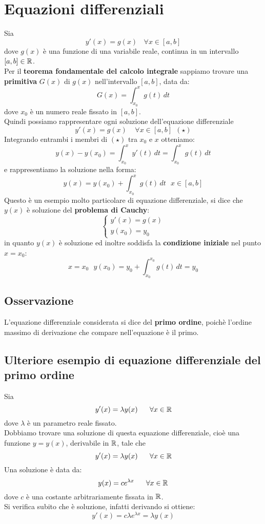 \documentclass[../../main.tex]{subfiles}
\begin{document}
\section{Equazioni differenziali}
Sia
\[
    y'(x) = g(x) \ \ \ \ \forall x \in [a, b]
\]
dove $g(x)$ è una funzione di una variabile reale, continua in un intervallo
$[a, b] \in \mathbb{R}$.\\ Per il \textbf{teorema fondamentale del calcolo integrale}
sappiamo trovare una \textbf{primitiva} $G(x)$ di $g(x)$ nell'intervallo
$[a,b]$, data da:
\[
    G(x) = {\int_{x_0}^{x}  g(t)\,dt }
\]
dove $x_0$ è un numero reale fissato in $[a, b]$. \\ Quindi possiamo
rappresentare ogni soluzione dell'equazione differenziale
\[
    y'(x) = g(x) \ \ \ \ \ \forall x\in [a, b] \ \ (\star)
\]
Integrando entrambi i membri di $(\star)$ tra $x_0$ e $x$ otteniamo:
\[
    y(x)-y(x_0) = \int_{x_0}^{x} y'(t)\,dt = \int_{x_0}^{x} g(t)\,dt
\]
e rappresentiamo la soluzione nella forma:
\[
    y(x) = y(x_0) + \int_{x_0}^{x} g(t)\,dt \ \ \ x\in [a, b]
\]
Questo è un esempio molto particolare di equazione differenziale, si dice che
$y(x)$ è soluzione del \textbf{problema di Cauchy}:
\[
    \begin{cases}
        y'(x) = g(x) \\
        y(x_0) = y_0
    \end{cases}
\]
in quanto $y(x)$ è soluzione ed inoltre soddisfa la \textbf{condizione
    iniziale} nel punto $x = x_0$:
\[
    x = x_0 \ \ \ y(x_0) = y_0 + \int_{x_0}^{x_0} g(t)\,dt = y_0
\]
\subsection{Osservazione}
L'equazione differenziale considerata si dice del \textbf{primo ordine}, poichè
l'ordine massimo di derivazione che compare nell'equazione è il primo.

\subsection{Ulteriore esempio di equazione differenziale del primo ordine}
Sia
\[
    y'(x) = \lambda y(x) \ \ \ \ \ \forall x \in \R
\]
dove $\lambda$ è un parametro reale fissato. \\ Dobbiamo trovare una soluzione
di questa equazione differenziale, cioè una funzione $y = y(x)$, derivabile in
$\mathbb{R}$, tale che
\[
    y'(x) = \lambda y(x) \ \ \ \ \ \forall x \in \R
\]
Una soluzione è data da:
\[
    y(x) = ce^{\lambda x} \ \ \ \ \ \forall x \in \mathbb{R}
\]
dove $c$ è una costante arbitrariamente fissata in $\mathbb{R}$.\\ Si verifica subito
che è soluzione, infatti derivando si ottiene:
\[
    y'(x) = c\lambda e^{\lambda x} = \lambda y(x)
\]
\end{document}
